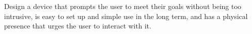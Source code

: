 Design a device that prompts the user to meet their goals without being too intrusive, is easy to set up and simple use in the long term, and has a physical presence that urges the user to interact with it.